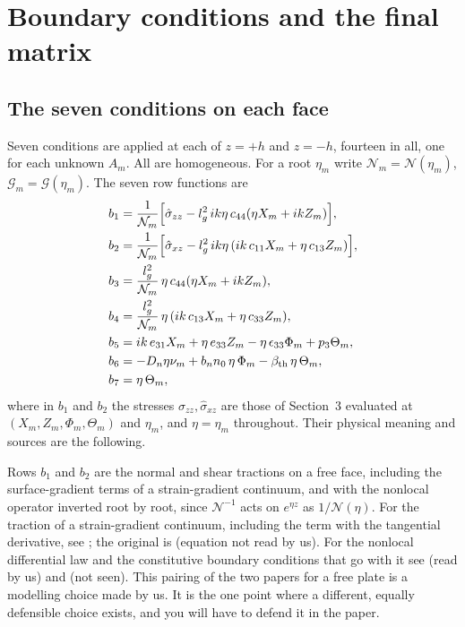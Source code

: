 \documentclass[11pt]{article}
\begin{document}
\section{Boundary conditions and the final matrix}

\subsection{The seven conditions on each face}

Seven conditions are applied at each of $z=+h$ and $z=-h$, fourteen in all, one for each unknown $A_m$.
All are homogeneous. For a root $\eta_m$ write $\mathcal N_m=\mathcal N(\eta_m)$, $\mathcal G_m=\mathcal G(\eta_m)$.
The seven row functions are
\begin{align}
b_1&=\frac1{\mathcal N_m}\Bigl[\hat\sigma_{zz}-l_g^2\,ik\eta\,c_{44}(\eta X_m+ikZ_m)\Bigr],\label{eq:b1}\\
b_2&=\frac1{\mathcal N_m}\Bigl[\hat\sigma_{xz}-l_g^2\,ik\eta\,(ik\,c_{11}X_m+\eta\,c_{13}Z_m)\Bigr],\label{eq:b2}\\
b_3&=\frac{l_g^2}{\mathcal N_m}\,\eta\,c_{44}(\eta X_m+ikZ_m),\label{eq:b3}\\
b_4&=\frac{l_g^2}{\mathcal N_m}\,\eta\,(ik\,c_{13}X_m+\eta\,c_{33}Z_m),\label{eq:b4}\\
b_5&=ik\,e_{31}X_m+\eta\,e_{33}Z_m-\eta\,\epsilon_{33}\Phi_m+p_3\Theta_m,\label{eq:b5}\\
b_6&=-D_n\eta\nu_m+b_nn_0\,\eta\,\Phi_m-\beta_{\rm th}\,\eta\,\Theta_m,\label{eq:b6}\\
b_7&=\eta\,\Theta_m ,\label{eq:b7}
\end{align}
where in $b_1$ and $b_2$ the stresses $\hat\sigma_{zz},\hat\sigma_{xz}$ are those of Section~3 evaluated at
$(X_m,Z_m,\Phi_m,\Theta_m)$ and $\eta_m$, and $\eta=\eta_m$ throughout. Their physical meaning and sources are the
following.

Rows $b_1$ and $b_2$ are the normal and shear tractions on a free face, including the surface-gradient
terms of a strain-gradient continuum, and with the nonlocal operator inverted root by root, since
$\mathcal N^{-1}$ acts on $e^{\eta z}$ as $1/\mathcal N(\eta)$. For the traction of a strain-gradient continuum,
including the term with the tangential derivative, see \cite[Sec.~2, Eq.~(14)]{Charal2019}; the original is
\cite{Mindlin1964} (equation not read by us). For the nonlocal differential law and the constitutive boundary
conditions that go with it see \cite[Eqs.\ (18)--(19)]{Barretta2018} (read by us) and \cite{Lim2015}
(not seen). This pairing of the two papers for a free plate is a modelling choice made by us. It is the
one point where a different, equally defensible choice exists, and you will have to defend it in the paper.
\end{document}
